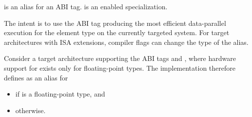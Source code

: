\begin{itemdescr}
\pnum
{} is an  alias for an ABI tag.
 is an enabled specialization.
\begin{note}
The intent is to use the ABI tag producing the most efficient data-parallel
execution for the element type  on the currently targeted system.
For target architectures with ISA extensions, compiler flags can change the type
of the  alias.
\end{note}
\begin{example}
Consider a target architecture supporting the ABI tags  and
, where hardware support for  exists only for
floating-point types.
The implementation therefore defines  as an alias
for
\begin{itemize}
\item {} if  is a floating-point type, and
\item {} otherwise.
\end{itemize}
\end{example}
\end{itemdescr}

